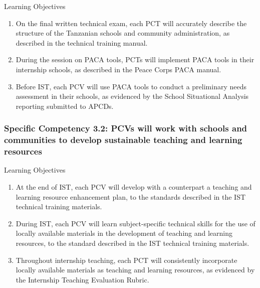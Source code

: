 Learning Objectives
\begin{enumerate}
\item On the final written technical exam, each PCT will accurately describe the structure of the Tanzanian schools and community administration,
as described in the technical training manual.
\item During the session on PACA tools, PCTs will implement PACA tools in
their internship schools, as described in the Peace Corps PACA manual.
\item Before IST, each PCV will use PACA tools to conduct a preliminary
needs assessment in their schools, as evidenced by the School Situational Analysis reporting submitted to APCDs.
\end{enumerate}

\subsubsection*{Specific Competency 3.2: PCVs will work with schools
and communities to develop sustainable teaching and
learning resources}

Learning Objectives
\begin{enumerate}
\item At the end of IST, each PCV will develop with a counterpart a teaching
and learning resource enhancement plan, to the standards described in
the IST technical training materials.

\item During IST, each PCV will learn subject-specific technical skills for
the use of locally available materials in the development of teaching
and learning resources, to the standard described in the IST technical
training materials.

\item Throughout internship teaching, each PCT will consistently incorporate locally available materials as teaching and learning resources, as
evidenced by the Internship Teaching Evaluation Rubric.
\end{enumerate}